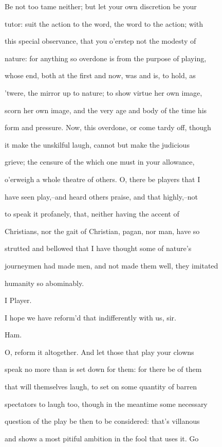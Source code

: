 \documentclass[12pt]{book}
\begin{document}
Be not too tame neither; but let your own discretion be your

tutor: suit the action to the word, the word to the action; with

this special observance, that you o'erstep not the modesty of

nature: for anything so overdone is from the purpose of playing,

whose end, both at the first and now, was and is, to hold, as

'twere, the mirror up to nature; to show virtue her own image,

scorn her own image, and the very age and body of the time his

form and pressure. Now, this overdone, or come tardy off, though

it make the unskilful laugh, cannot but make the judicious

grieve; the censure of the which one must in your allowance,

o'erweigh a whole theatre of others. O, there be players that I

have seen play,--and heard others praise, and that highly,--not

to speak it profanely, that, neither having the accent of

Christians, nor the gait of Christian, pagan, nor man, have so

strutted and bellowed that I have thought some of nature's

journeymen had made men, and not made them well, they imitated

humanity so abominably.



I Player.

I hope we have reform'd that indifferently with us, sir.



Ham.

O, reform it altogether. And let those that play your clowns

speak no more than is set down for them: for there be of them

that will themselves laugh, to set on some quantity of barren

spectators to laugh too, though in the meantime some necessary

question of the play be then to be considered: that's villanous

and shows a most pitiful ambition in the fool that uses it. Go
\end{document}
